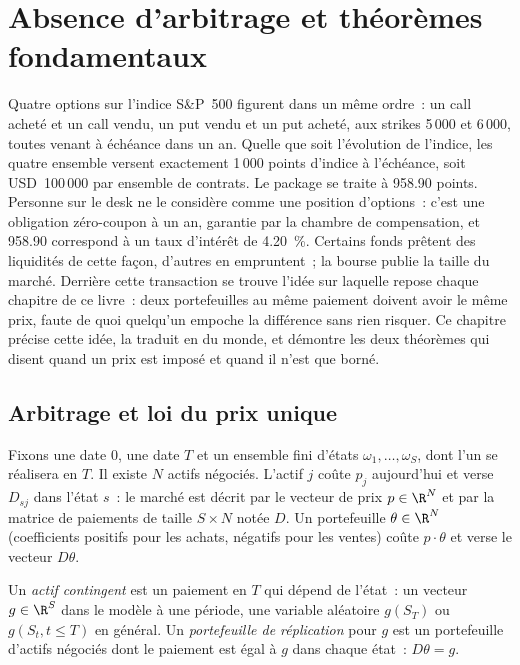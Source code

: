 \chapter{Absence d'arbitrage et théorèmes fondamentaux}\label{ch:dv:no-arbitrage-and-the-fundamental-theorems}

Quatre options sur l'indice S\&P~500 figurent dans un même ordre~: un call acheté et un call vendu,
un put vendu et un put acheté, aux strikes 5\,000 et 6\,000, toutes venant à échéance dans
un an. Quelle que soit l'évolution de l'indice, les quatre ensemble versent exactement 1\,000 points d'indice
à l'échéance, soit USD~100\,000 par ensemble de contrats. Le package se traite à
958.90 points. Personne sur le desk ne le considère comme une position d'options~: c'est une
obligation zéro-coupon à un an, garantie par la chambre de compensation, et 958.90 correspond à un
taux d'intérêt de 4.20~\%. Certains fonds prêtent des liquidités de cette façon, d'autres en empruntent~; la
bourse publie la taille du marché. Derrière cette transaction se trouve l'idée sur laquelle
repose chaque chapitre de ce livre~: deux portefeuilles au même paiement
doivent avoir le même prix, faute de quoi quelqu'un empoche la différence sans rien risquer. Ce
chapitre précise cette idée, la traduit en  du monde,
et démontre les deux théorèmes qui disent quand un prix est imposé et quand il n'est
que borné.

\section{Arbitrage et loi du prix unique}

Fixons une date $0$, une date $T$ et un ensemble fini d'états $\omega_1,\dots,\omega_S$,
dont l'un se réalisera en $T$. Il existe $N$ actifs négociés. L'actif $j$ coûte
$p_j$ aujourd'hui et verse $D_{sj}$ dans l'état $s$~: le marché est décrit par le vecteur de prix
$p\in\R^N$ et par la matrice de paiements de taille $S\times N$ notée $D$. Un portefeuille
$\theta\in\R^N$ (coefficients positifs pour les achats, négatifs pour les ventes) coûte $p\cdot\theta$
et verse le vecteur $D\theta$.

\begin{definition}\label{def:dv:no-arbitrage-and-the-fundamental-theorems:claim}
Un \emph{actif contingent} est un paiement en $T$ qui
dépend de l'état~: un vecteur $g\in\R^S$ dans le modèle à une période, une variable aléatoire
$g(S_T)$ ou $g(S_t, t\le T)$ en général. Un \emph{portefeuille de
réplication} pour $g$ est un portefeuille d'actifs négociés
dont le paiement est égal à $g$ dans chaque état~: $D\theta = g$.
\end{definition}

